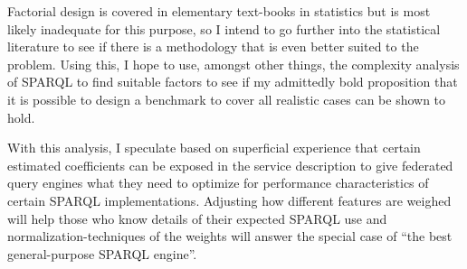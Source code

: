 \documentclass{llncs}
\begin{document}
Factorial design is covered in elementary text-books in
statistics but is most likely inadequate for this purpose, so I intend
to go further into the statistical literature to see if there is a
methodology that is even better suited to the problem. Using
this, I hope to use, amongst other things, the complexity analysis of
SPARQL to find suitable factors to see if my admittedly bold
proposition that it is possible to design a benchmark to cover all
realistic cases can be shown to hold.

With this analysis, I speculate based on superficial experience that
certain estimated coefficients can be exposed in the service
description to give federated query engines what they need to optimize
for performance characteristics of certain SPARQL
implementations. Adjusting how different features are weighed will
help those who know details of their expected SPARQL use and
normalization-techniques of the weights will answer the special case
of ``the best general-purpose SPARQL engine''.




%

%

\end{document}
